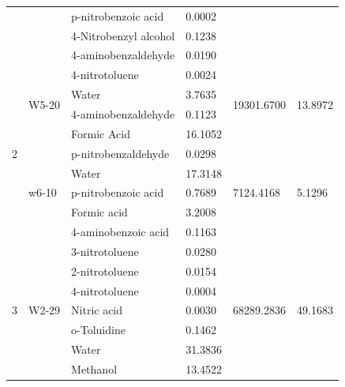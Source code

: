 \begin{table}[h]
{\begin{tabular}{@{}llllll@{}}
 &  & p-nitrobenzoic acid & 0.0002 &  &  \\
 &  & 4-Nitrobenzyl alcohol & 0.1238 &  &  \\
 &  & 4-aminobenzaldehyde & 0.0190 &  &  \\
\multirow{9}{*}{2} & \multirow{4}{*}{W5-20} & 4-nitrotoluene & 0.0024 & \multirow{4}{*}{19301.6700} & \multirow{4}{*}{13.8972} \\
 &  & Water & 3.7635 &  &  \\
 &  & 4-aminobenzaldehyde & 0.1123 &  &  \\
 &  & Formic Acid & 16.1052 &  &  \\
 & \multirow{5}{*}{w6-10} & p-nitrobenzaldehyde & 0.0298 & \multirow{5}{*}{7124.4168} & \multirow{5}{*}{5.1296} \\
 &  & Water & 17.3148 &  &  \\
 &  & p-nitrobenzoic acid & 0.7689 &  &  \\
 &  & Formic acid & 3.2008 &  &  \\
 &  & 4-aminobenzoic acid & 0.1163 &  &  \\
\multirow{7}{*}{3} & \multirow{7}{*}{W2-29} & 3-nitrotoluene & 0.0280 & \multirow{7}{*}{68289.2836} & \multirow{7}{*}{49.1683} \\
 &  & 2-nitrotoluene & 0.0154 &  &  \\
 &  & 4-nitrotoluene & 0.0004 &  &  \\
 &  & Nitric acid & 0.0030 &  &  \\
 &  & o-Toluidine & 0.1462 &  &  \\
 &  & Water & 31.3836 &  &  \\
 &  & Methanol & 13.4522 &  &  \\ \cmidrule(lr){3-4}
\end{tabular}%
}
\end{table}


